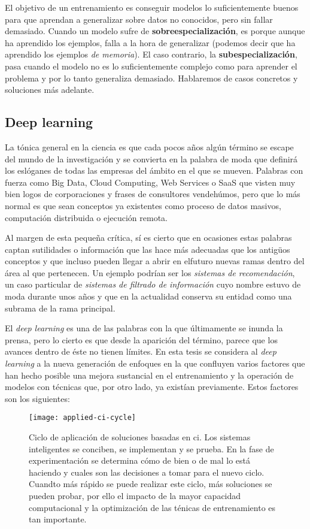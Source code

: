 El objetivo de un entrenamiento es conseguir modelos lo suficientemente buenos para que aprendan a generalizar sobre datos no conocidos, pero sin fallar demasiado. Cuando un modelo sufre de \textbf{sobreespecialización}, es porque aunque ha aprendido los ejemplos, falla a la hora de generalizar (podemos decir que ha aprendido los ejemplos \textit{de memoria}). El caso contrario, la \textbf{subespecialización}, pasa cuando el modelo no es lo suficientemente complejo como para aprender el problema y por lo tanto generaliza demasiado. Hablaremos de casos concretos y soluciones más adelante.

\subsection{Deep learning}

La tónica general en la ciencia es que cada pocos años algún término se escape del mundo de la investigación y se convierta en la palabra de moda que definirá los eslóganes de todas las empresas del ámbito en el que se mueven. Palabras con fuerza como Big Data, Cloud Computing, Web Services o SaaS que visten muy bien logos de corporaciones y frases de consultores vendehúmos, pero que lo más normal es que sean conceptos ya existentes como proceso de datos masivos, computación distribuida o ejecución remota.

Al margen de esta pequeña crítica, sí es cierto que en ocasiones estas palabras captan sutilidades o información que las hace más adecuadas que los antigüos conceptos y que incluso pueden llegar a abrir en elfuturo nuevas ramas dentro del área al que pertenecen. Un ejemplo podrían ser los \textit{sistemas de recomendación}, un caso particular de \textit{sistemas de filtrado de información} cuyo nombre estuvo de moda durante unos años y que en la actualidad conserva su entidad como una subrama de la rama principal.

El \textit{deep learning} es una de las palabras con la que últimamente se inunda la prensa, pero lo cierto es que desde la aparición del término, parece que los avances dentro de éste no tienen límites. En esta tesis se considera al \textit{deep learning} a la nueva generación de enfoques en la que confluyen varios factores que han hecho posible una mejora sustancial en el entrenamiento y la operación de modelos con técnicas que, por otro lado, ya existían previamente. Estos factores son los siguientes:

\begin{figure}[t]
	\centering
	\texttt{[image: applied-ci-cycle]}
	\caption[Ciclo de aplicación de soluciones basadas en \acrlong{ci}]{Ciclo de aplicación de soluciones basadas en \acrlong{ci}. Los sistemas inteligentes se conciben, se implementan y se prueba. En la fase de experimentación se determina cómo de bien o de mal lo está haciendo y cuales son las decisiones a tomar para el nuevo ciclo. Cuandto más rápido se puede realizar este ciclo, más soluciones se pueden probar, por ello el impacto de la mayor capacidad computacional y la optimización de las ténicas de entrenamiento es tan importante.}
	\label{fig:applied-ci-cycle}
\end{figure}

